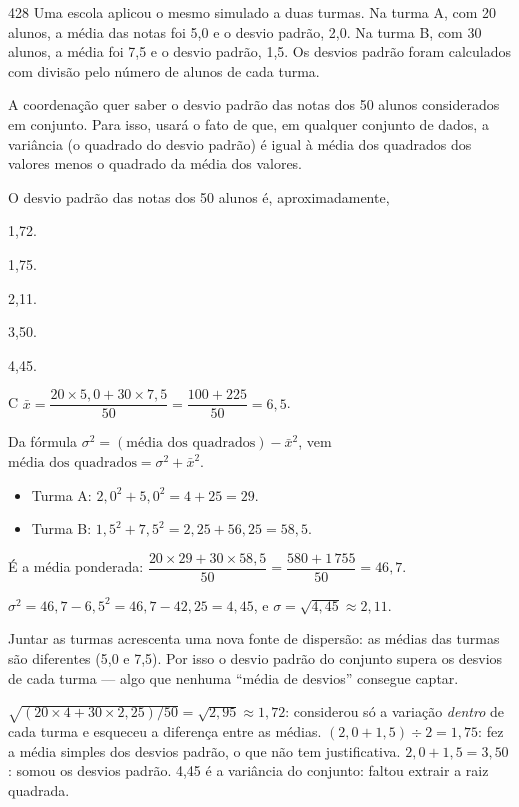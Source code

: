 \begin{questaoinedita}{4}{28}
Uma escola aplicou o mesmo simulado a duas turmas. Na turma A, com 20 alunos, a média das notas foi
5,0 e o desvio padrão, 2,0. Na turma B, com 30 alunos, a média foi 7,5 e o desvio padrão, 1,5. Os
desvios padrão foram calculados com divisão pelo número de alunos de cada turma.

A coordenação quer saber o desvio padrão das notas dos 50 alunos considerados em conjunto. Para isso,
usará o fato de que, em qualquer conjunto de dados, a variância (o quadrado do desvio padrão) é igual
à média dos quadrados dos valores menos o quadrado da média dos valores.

O desvio padrão das notas dos 50 alunos é, aproximadamente,
\begin{alternativas*}[5]
\item 1,72.
\item 1,75.
\item 2,11.
\item 3,50.
\item 4,45.
\end{alternativas*}
\end{questaoinedita}
\begin{resolucao}{C}
 $\bar{x} = \dfrac{20 \times 5{,}0 + 30 \times 7{,}5}{50} = \dfrac{100 + 225}{50} = 6{,}5$.

 Da fórmula
$\sigma^2 = (\text{média dos quadrados}) - \bar{x}^2$, vem
$\text{média dos quadrados} = \sigma^2 + \bar{x}^2$.
\begin{itemize}[nosep,leftmargin=1.2em]
  \item Turma A: $2{,}0^2 + 5{,}0^2 = 4 + 25 = 29$.
  \item Turma B: $1{,}5^2 + 7{,}5^2 = 2{,}25 + 56{,}25 = 58{,}5$.
\end{itemize}

 É a média ponderada:
$\dfrac{20 \times 29 + 30 \times 58{,}5}{50} = \dfrac{580 + 1\,755}{50} = 46{,}7$.

 $\sigma^2 = 46{,}7 - 6{,}5^2 = 46{,}7 - 42{,}25 = 4{,}45$,
e $\sigma = \sqrt{4{,}45} \approx 2{,}11$.

 Juntar as turmas acrescenta uma nova fonte
de dispersão: as médias das turmas são diferentes (5,0 e 7,5). Por isso o desvio padrão do conjunto
supera os desvios de cada turma — algo que nenhuma “média de desvios” consegue captar.

\begin{distratores}
 $\sqrt{(20 \times 4 + 30 \times 2{,}25)/50} = \sqrt{2{,}95} \approx 1{,}72$: considerou só a variação
\emph{dentro} de cada turma e esqueceu a diferença entre as médias.
 $(2{,}0 + 1{,}5) \div 2 = 1{,}75$: fez a média simples dos desvios padrão, o que não tem
justificativa.
 $2{,}0 + 1{,}5 = 3{,}50$: somou os desvios padrão.
 4,45 é a variância do conjunto: faltou extrair a raiz quadrada.
\end{distratores}
\end{resolucao}

